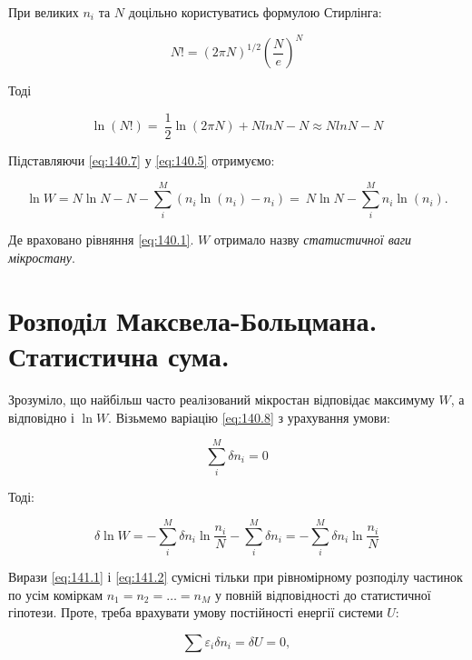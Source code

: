При великих $n_i$ та $N$ доцільно користуватись формулою Стирлінга:

\begin{equation}
	N!={(2\pi N)}^{1/2}{\left(\frac{N}{e}\right)}^N
	\label{eq:140.6}
\end{equation}

Тоді

\begin{equation}
	\ln{\left(N!\right)}=\ \frac{1}{2}\ln{\left(2\pi N\right)}+NlnN-N\approx NlnN-N
	\label{eq:140.7}
\end{equation}

Підставляючи \eqref{eq:140.7} у \eqref{eq:140.5} отримуємо:

\begin{equation}
	\ln{W}=N\ln{N}-N-\sum_{i}^{M}{\left(n_i\ln{\left(n_i\right)}-n_i\right)=}\ N\ln{N}-\sum_{i}^{M}{n_i\ln{\left(n_i\right)}}.
	\label{eq:140.8}
\end{equation}

Де враховано рівняння \eqref{eq:140.1}. $W$ отримало назву \emph{статистичної ваги мікростану}.

\section{Розподіл Максвела-Больцмана. Статистична сума.}

Зрозуміло, що найбільш часто реалізований мікростан відповідає максимуму $W$, а відповідно і $\ln W$. Візьмемо варіацію \eqref{eq:140.8} з урахування умови:

\begin{equation}
	\sum_i^M \delta n_i = 0
	\label{eq:141.1}
\end{equation}

Тоді:

\begin{equation}
	\delta \ln W = - \sum_i^M \delta n_i \ln \frac{n_i}{N} - \sum_i^M \delta n_i = - \sum_i^M \delta n_i \ln \frac{n_i}{N}
	\label{eq:141.2}
\end{equation}

Вирази \eqref{eq:141.1} і \eqref{eq:141.2} сумісні тільки при рівномірному розподілу частинок по усім коміркам $n_1 = n_2 = \dots = n_M$ у повній відповідності до статистичної гіпотези. Проте, треба врахувати умову постійності енергії системи $U$:

\begin{equation}
	\sum{\varepsilon_i\delta n_i=\delta U=0},
	\label{eq:141.3}
\end{equation}

